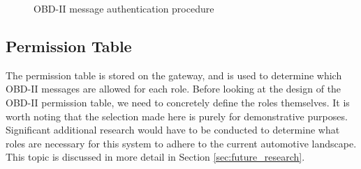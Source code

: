 \begin{figure}[h]
	\centering
	\caption{OBD-II message authentication procedure}
	\label{fig:message_authentication}
\end{figure}

\subsection{Permission Table} 
\label{subsec:sol_permissions_table}
The permission table is stored on the gateway, and is used to determine which OBD-II messages are allowed for each role. Before looking at the design of the OBD-II permission table, we need to concretely define the roles themselves. It is worth noting that the selection made here is purely for demonstrative purposes. Significant additional research would have to be conducted to determine what roles are necessary for this system to adhere to the current automotive landscape. This topic is discussed in more detail in Section \ref{sec:future_research}.

